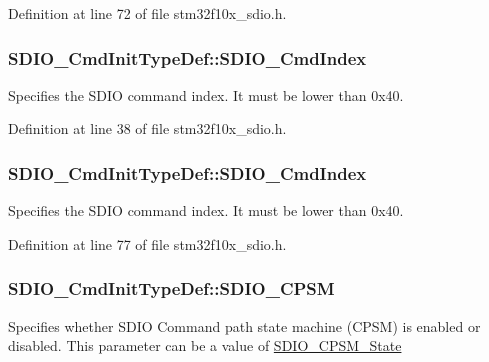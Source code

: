 Definition at line 72 of file stm32f10x\+\_\+sdio.\+h.

\subsubsection[{\texorpdfstring{S\+D\+I\+O\+\_\+\+Cmd\+Index}{SDIO_CmdIndex}}]{ S\+D\+I\+O\+\_\+\+Cmd\+Init\+Type\+Def\+::\+S\+D\+I\+O\+\_\+\+Cmd\+Index}\hypertarget{struct_s_d_i_o___cmd_init_type_def_ab4e4ff40d8295a9cf08829e552dec964}{}\label{struct_s_d_i_o___cmd_init_type_def_ab4e4ff40d8295a9cf08829e552dec964}
Specifies the S\+D\+IO command index. It must be lower than 0x40. 

Definition at line 38 of file stm32f10x\+\_\+sdio.\+h.

\subsubsection[{\texorpdfstring{S\+D\+I\+O\+\_\+\+Cmd\+Index}{SDIO_CmdIndex}}]{ S\+D\+I\+O\+\_\+\+Cmd\+Init\+Type\+Def\+::\+S\+D\+I\+O\+\_\+\+Cmd\+Index}\hypertarget{struct_s_d_i_o___cmd_init_type_def_ab5e1df1f0e8d48a308edfb59a6f80fb4}{}\label{struct_s_d_i_o___cmd_init_type_def_ab5e1df1f0e8d48a308edfb59a6f80fb4}
Specifies the S\+D\+IO command index. It must be lower than 0x40. 

Definition at line 77 of file stm32f10x\+\_\+sdio.\+h.

\subsubsection[{\texorpdfstring{S\+D\+I\+O\+\_\+\+C\+P\+SM}{SDIO_CPSM}}]{ S\+D\+I\+O\+\_\+\+Cmd\+Init\+Type\+Def\+::\+S\+D\+I\+O\+\_\+\+C\+P\+SM}\hypertarget{struct_s_d_i_o___cmd_init_type_def_a154cbf69d4b6538b10a8de4b6422b9ce}{}\label{struct_s_d_i_o___cmd_init_type_def_a154cbf69d4b6538b10a8de4b6422b9ce}
Specifies whether S\+D\+IO Command path state machine (C\+P\+SM) is enabled or disabled. This parameter can be a value of \hyperlink{group___s_d_i_o___c_p_s_m___state}{S\+D\+I\+O\+\_\+\+C\+P\+S\+M\+\_\+\+State} 

